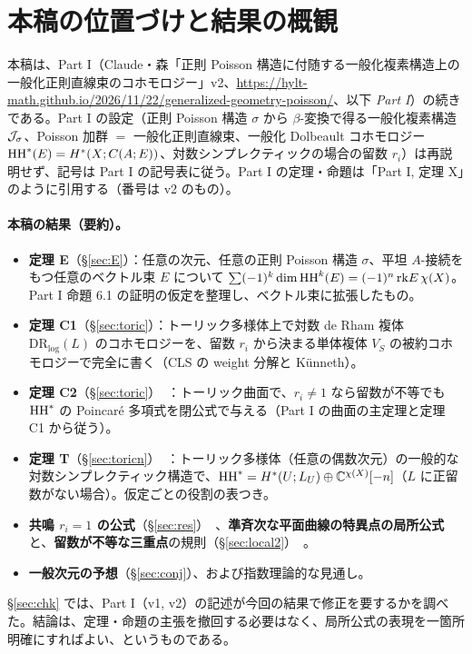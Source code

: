 \section{本稿の位置づけと結果の概観}\label{sec:intro}
本稿は、Part I（Claude・森「正則 Poisson 構造に付随する一般化複素構造上の一般化正則直線束のコホモロジー」v2、\url{https://hylt-math.github.io/2026/11/22/generalized-geometry-poisson/}、以下 \emph{Part I}）の続きである。Part I の設定（正則 Poisson 構造 $\sigma$ から $\beta$-変換で得る一般化複素構造 $\mathcal J_\sigma$、Poisson 加群 $=$ 一般化正則直線束、一般化 Dolbeault コホモロジー $\mathrm{HH}^*(E)=H^*(X;C(A;E))$、対数シンプレクティックの場合の留数 $r_i$）は再説明せず、記号は Part I の記号表に従う。Part I の定理・命題は「Part I, 定理 X」のように引用する（番号は v2 のもの）。

\paragraph{本稿の結果（要約）。}
\begin{itemize}
\item \textbf{定理 E}（\S\ref{sec:E}）\tP：任意の次元、任意の正則 Poisson 構造 $\sigma$、平坦 $A$-接続をもつ任意のベクトル束 $E$ について $\sum(-1)^k\dim\mathrm{HH}^k(E)=(-1)^n\,\mathrm{rk} E\,\chi(X)$。Part I 命題 6.1 の証明の仮定を整理し、ベクトル束に拡張したもの。
\item \textbf{定理 C1}（\S\ref{sec:toric}）\tP：トーリック多様体上で対数 de Rham 複体 $\mathrm{DR}_{\log}(L)$ のコホモロジーを、留数 $r_i$ から決まる単体複体 $V_S$ の被約コホモロジーで完全に書く（CLS の weight 分解と Künneth）。
\item \textbf{定理 C2}（\S\ref{sec:toric}）\tP\ \tV：トーリック曲面で、$r_i\ne1$ なら留数が不等でも $\mathrm{HH}^*$ の Poincaré 多項式を閉公式で与える（Part I の曲面の主定理と定理 C1 から従う）。
\item \textbf{定理 T}（\S\ref{sec:toricn}）\tP\ \tV：トーリック多様体（任意の偶数次元）の一般的な対数シンプレクティック構造で、$\mathrm{HH}^*=H^*(U;L_U)\oplus\mathbb C^{\chi(X)}[-n]$（$L$ に正留数がない場合）。仮定ごとの役割の表つき。
\item \textbf{共鳴 $r_i=1$ の公式}（\S\ref{sec:res}）\tV\ \tK、\textbf{準斉次な平面曲線の特異点の局所公式}と、\textbf{留数が不等な三重点}の規則（\S\ref{sec:local2}）\tV\ \tK。
\item \textbf{一般次元の予想}（\S\ref{sec:conj}）\tK、および指数理論的な見通し。
\end{itemize}
\S\ref{sec:chk} では、Part I（v1, v2）の記述が今回の結果で修正を要するかを調べた。結論は、定理・命題の主張を撤回する必要はなく、局所公式の表現を一箇所明確にすればよい、というものである。

